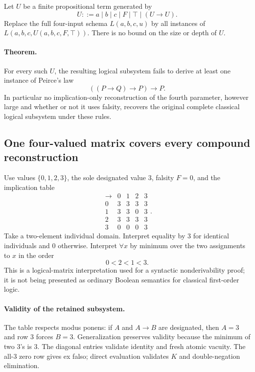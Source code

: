 Let $U$ be a finite propositional term generated by
\[
 U ::= a\mid b\mid c\mid F\mid\top\mid(U\to U).
\]
Replace the full four-input schema $L(a,b,c,u)$ by all instances of
$L(a,b,c,U(a,b,c,F,\top))$.  There is no bound on the size or depth of
$U$.

\paragraph{Theorem.}
For every such $U$, the resulting logical subsystem fails to derive at
least one instance of Peirce's law
\[
 ((P\to Q)\to P)\to P.
\]
In particular no implication-only reconstruction of the fourth
parameter, however large and whether or not it uses falsity, recovers
the original complete classical logical subsystem under these rules.

\subsection{One four-valued matrix covers every compound reconstruction}

Use values $\{0,1,2,3\}$, the sole designated value $3$, falsity $F=0$,
and the implication table
\[
\begin{array}{c|cccc}
 \to&0&1&2&3\\\hline
 0&3&3&3&3\\
 1&3&3&0&3\\
 2&3&3&3&3\\
 3&0&0&0&3
\end{array}.
\tag{M4}\label{eq:fourth-m4}
\]
Take a two-element individual domain.  Interpret equality by $3$ for
identical individuals and $0$ otherwise.  Interpret $\forall x$ by
minimum over the two assignments to $x$ in the order
\[
 0<2<1<3.
\]
This is a logical-matrix interpretation used for a syntactic
nonderivability proof; it is not being presented as ordinary Boolean
semantics for classical first-order logic.

\paragraph{Validity of the retained subsystem.}
The table respects modus ponens: if $A$ and $A\to B$ are designated,
then $A=3$ and row $3$ forces $B=3$.  Generalization preserves validity
because the minimum of two $3$'s is $3$.  The diagonal entries validate
identity and fresh atomic vacuity.  The all-$3$ zero row gives ex falso;
direct evaluation validates $K$ and double-negation elimination.

